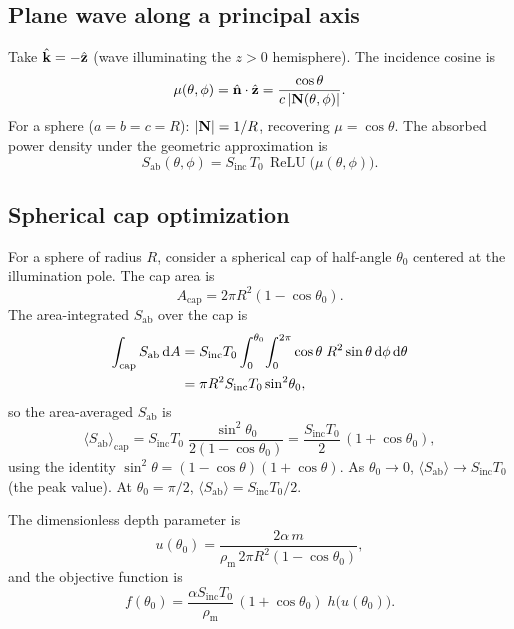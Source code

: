 \documentclass[11pt,a4paper]{article}
\theoremstyle{definition}
\theoremstyle{remark}
\newcommand{\Sab}{S_{\mathrm{ab}}}
\newcommand{\Sinc}{S_{\mathrm{inc}}}
\newcommand{\Tzero}{T_0}
\newcommand{\nhat}{\hat{\vb{n}}}
\newcommand{\khat}{\hat{\vb{k}}}
\newcommand{\rhom}{\rho_{\mathrm{m}}}
\newcommand{\ReLU}{\operatorname{ReLU}}
\begin{document}
\subsection{Plane wave along a principal axis}

Take $\khat = -\hat{\vb{z}}$ (wave illuminating the $z > 0$ hemisphere).
The incidence cosine is
\begin{equation}\label{eq:mu-ellipsoid}
  \mu(\theta,\phi)
  = \nhat \cdot \hat{\vb{z}}
  = \frac{\cos\theta}{c\,|\vb{N}(\theta,\phi)|}.
\end{equation}
For a sphere ($a = b = c = R$): $|\vb{N}| = 1/R$, recovering $\mu = \cos\theta$.
The absorbed power density under the geometric approximation is
\begin{equation}\label{eq:Sab-ellipsoid}
  \Sab(\theta,\phi) = \Sinc\,\Tzero\,\ReLU\!\bigl(\mu(\theta,\phi)\bigr).
\end{equation}

\subsection{Spherical cap optimization}
\label{sec:sphere}

For a sphere of radius $R$, consider a spherical cap of half-angle $\theta_0$
centered at the illumination pole. The cap area is
\begin{equation}\label{eq:cap-area}
  A_{\mathrm{cap}} = 2\pi R^2(1 - \cos\theta_0).
\end{equation}
The area-integrated $\Sab$ over the cap is
\begin{align}
  \int_{\mathrm{cap}} \Sab\,\mathrm{d}A
  &= \Sinc\Tzero\int_0^{\theta_0}\!\int_0^{2\pi}
     \cos\theta\;R^2\sin\theta\,\mathrm{d}\phi\,\mathrm{d}\theta \notag\\
  &= \pi R^2\Sinc\Tzero\sin^2\!\theta_0,
\end{align}
so the area-averaged $\Sab$ is
\begin{equation}\label{eq:Sab-cap}
  \langle\Sab\rangle_{\mathrm{cap}}
  = \Sinc\Tzero\;\frac{\sin^2\!\theta_0}{2(1 - \cos\theta_0)}
  = \frac{\Sinc\Tzero}{2}\,(1 + \cos\theta_0),
\end{equation}
using the identity $\sin^2\!\theta = (1-\cos\theta)(1+\cos\theta)$. As
$\theta_0 \to 0$, $\langle\Sab\rangle \to \Sinc\Tzero$ (the peak value).
At $\theta_0 = \pi/2$, $\langle\Sab\rangle = \Sinc\Tzero/2$.

The dimensionless depth parameter is
\begin{equation}\label{eq:u-cap}
  u(\theta_0) = \frac{2\alpha\,m}{\rhom\,2\pi R^2(1-\cos\theta_0)},
\end{equation}
and the objective function is
\begin{equation}\label{eq:f-sphere}
  f(\theta_0)
  = \frac{\alpha\Sinc\Tzero}{\rhom}\,(1 + \cos\theta_0)\;
    h\!\bigl(u(\theta_0)\bigr).
\end{equation}
\end{document}
